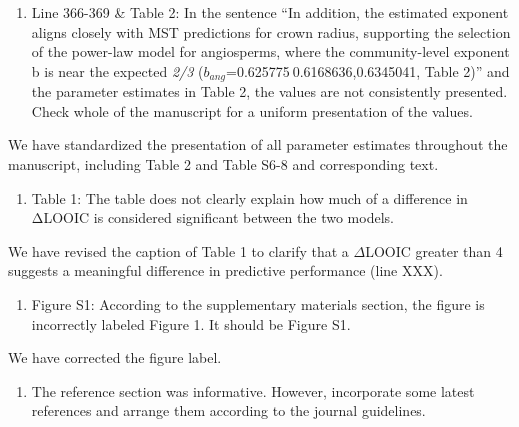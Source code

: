 \documentclass[
  12pt,
  letterpaper,
  DIV=11,
  numbers=noendperiod]{scrartcl}
\providecommand{\tightlist}{%
  \setlength{\itemsep}{0pt}\setlength{\parskip}{0pt}}\usepackage{longtable,booktabs,array}
\renewenvironment{quote}
  {\begin{customblockquote}\color{blockquote-text}\ignorespaces}
  {\end{customblockquote}}
\begin{document}
\begin{quote}
\begin{enumerate}
\def\labelenumi{\arabic{enumi})}
\setcounter{enumi}{3}
\tightlist
\item
  Line 366-369 \& Table 2: In the sentence ``In addition, the estimated
  exponent aligns closely with MST predictions for crown radius,
  supporting the selection of the power-law model for angiosperms, where
  the community-level exponent b is near the expected \emph{2/3}
  (\(b_{ang}\)=0.625775 0.6168636,0.6345041, Table 2)'' and the
  parameter estimates in Table 2, the values are not consistently
  presented. Check whole of the manuscript for a uniform presentation of
  the values.
\end{enumerate}
\end{quote}

We have standardized the presentation of all parameter estimates
throughout the manuscript, including Table 2 and Table S6-8 and
corresponding text.

\begin{quote}
\begin{enumerate}
\def\labelenumi{\arabic{enumi})}
\setcounter{enumi}{4}
\tightlist
\item
  Table 1: The table does not clearly explain how much of a difference
  in ΔLOOIC is considered significant between the two models.
\end{enumerate}
\end{quote}

We have revised the caption of Table 1 to clarify that a \(\Delta\)LOOIC
greater than 4 suggests a meaningful difference in predictive
performance (line XXX).

\begin{quote}
\begin{enumerate}
\def\labelenumi{\arabic{enumi})}
\setcounter{enumi}{5}
\tightlist
\item
  Figure S1: According to the supplementary materials section, the
  figure is incorrectly labeled Figure 1. It should be Figure S1.
\end{enumerate}
\end{quote}

We have corrected the figure label.

\begin{quote}
\begin{enumerate}
\def\labelenumi{\arabic{enumi})}
\setcounter{enumi}{6}
\tightlist
\item
  The reference section was informative. However, incorporate some
  latest references and arrange them according to the journal
  guidelines.
\end{enumerate}
\end{quote}
\end{document}
